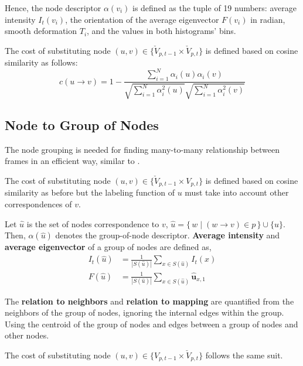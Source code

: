 \documentclass{article}
\begin{document}
Hence, the node descriptor $\alpha(v_i)$ is defined as the tuple of 19 numbers: average intensity $I_t(v_i)$, the orientation of the average eigenvector $F(v_i)$ in radian, smooth deformation $T_i$, and the values in both histograms' bins.

The cost of substituting node $(u,v) \in \{ \check{V}_{p,t-1} \times \check{V}_{p,t} \}$ is defined based on cosine similarity as follows:
\begin{equation}
c(u \rightarrow v) = 1 - \frac{\sum_{i=1}^N \alpha_i(u)\alpha_i(v)}{\sqrt{\sum_{i=1}^N \alpha_i^2(u)}\sqrt{\sum_{i=1}^N \alpha_i^2(v)}}
\end{equation}

\subsection{Node to Group of Nodes}
The node grouping is needed for finding many-to-many relationship between frames in an efficient way, similar to \cite{morrison2015}.

The cost of substituting node $(u,v) \in \{ \check{V}_{p,t-1} \times V_{p,t} \}$ is defined based on cosine similarity as before but the labeling function of $u$ must take into account other correspondences of $v$.

Let $\hat{u}$ is the set of nodes correspondence to $v$, $\hat{u} = \{\, w \mid (w \rightarrow v) \in p \,\} \cup \{u\}$. Then, $\alpha(\hat{u})$ denotes the group-of-node descriptor. \textbf{Average intensity} and \textbf{average eigenvector} of a group of nodes are defined as,
\begin{equation}
\begin{aligned}
I_t(\hat{u}) & = \frac{1}{|S(\hat{u})|}\sum_{x \in S(\hat{u})} I_t(x) \\
F(\hat{u}) & = \frac{1}{|S(\hat{u})|}\sum_{x \in S(\hat{u})} \hat{\textbf{u}}_{x,1}
\end{aligned}
\end{equation} 

The \textbf{relation to neighbors} and \textbf{relation to mapping} are quantified from the neighbors of the group of nodes, ignoring the internal edges within the group. Using the centroid of the group of nodes and edges between a group of nodes and other nodes.

The cost of substituting node $(u,v) \in \{ V_{p,t-1} \times \check{V}_{p,t} \}$ follows the same suit.
\end{document}
